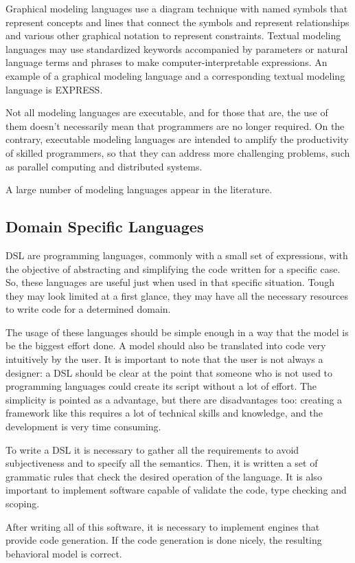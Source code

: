 \documentclass{report}
\begin{document}
	Graphical modeling languages use a diagram technique with named symbols that represent concepts and lines that connect the symbols and represent relationships and various other graphical notation to represent constraints.
	Textual modeling languages may use standardized keywords accompanied by parameters or natural language terms and phrases to make computer-interpretable expressions.
	An example of a graphical modeling language and a corresponding textual modeling language is EXPRESS.
	
	Not all modeling languages are executable, and for those that are, the use of them doesn't necessarily mean that programmers are no longer required. On the contrary, executable modeling languages are intended to amplify the productivity of skilled programmers, so that they can address more challenging problems, such as parallel computing and distributed systems.
	
	A large number of modeling languages appear in the literature.
		
		\subsection{Domain Specific Languages}
		
		\par DSL are programming languages, commonly with a small set of expressions, with the objective of abstracting and simplifying the code written for a specific case. So, these languages are useful just when used in that specific situation. Tough they may look limited at a first glance, they may have all the necessary resources to write code for a determined domain.
		\par The usage of these languages should be simple enough in a way that the model is be the biggest effort done. A model should also be translated into code very intuitively by the user. It is important to note that the user is not always a designer: a DSL should be clear at the point that someone who is not used to programming languages could create its script without a lot of effort. The simplicity is pointed as a advantage, but there are disadvantages too: creating a framework like this requires a lot of technical skills and knowledge, and the development is very time consuming.
		\par To write a DSL it is necessary to gather all the requirements to avoid subjectiveness and to specify all the semantics. Then, it is written a set of grammatic rules that check the desired operation of the language. It is also important to implement software capable of validate the code, type checking and scoping.
		\par After writing all of this software, it is necessary to implement engines that provide code generation. If the code generation is done nicely, the resulting behavioral model is correct.
		
\end{document}
